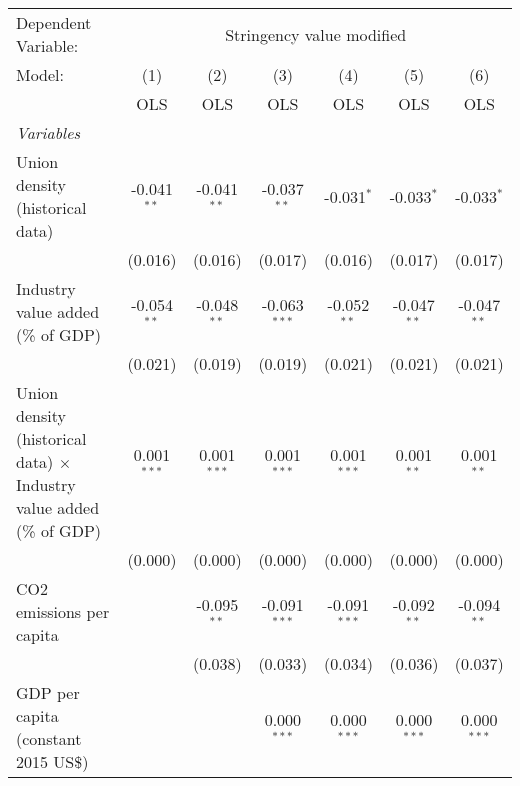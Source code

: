 
\begingroup
\centering
\begin{tabular}{lcccccc}
   \toprule
   Dependent Variable: & \multicolumn{6}{c}{Stringency value modified}\\
   Model:                                                                      & (1)           & (2)           & (3)            & (4)            & (5)           & (6)\\  
                                                                               &  OLS          & OLS           & OLS            & OLS            & OLS           & OLS\\  
   \midrule
   \emph{Variables}\\
   Union density (historical data)                                             & -0.041$^{**}$ & -0.041$^{**}$ & -0.037$^{**}$  & -0.031$^{*}$   & -0.033$^{*}$  & -0.033$^{*}$\\   
                                                                               & (0.016)       & (0.016)       & (0.017)        & (0.016)        & (0.017)       & (0.017)\\   
   Industry value added (\% of GDP)                                            & -0.054$^{**}$ & -0.048$^{**}$ & -0.063$^{***}$ & -0.052$^{**}$  & -0.047$^{**}$ & -0.047$^{**}$\\   
                                                                               & (0.021)       & (0.019)       & (0.019)        & (0.021)        & (0.021)       & (0.021)\\   
   Union density (historical data) $\times$ Industry value added (\% of GDP)   & 0.001$^{***}$ & 0.001$^{***}$ & 0.001$^{***}$  & 0.001$^{***}$  & 0.001$^{**}$  & 0.001$^{**}$\\   
                                                                               & (0.000)       & (0.000)       & (0.000)        & (0.000)        & (0.000)       & (0.000)\\   
   CO2 emissions per capita                                                    &               & -0.095$^{**}$ & -0.091$^{***}$ & -0.091$^{***}$ & -0.092$^{**}$ & -0.094$^{**}$\\   
                                                                               &               & (0.038)       & (0.033)        & (0.034)        & (0.036)       & (0.037)\\   
   GDP per capita (constant 2015 US\$)                                         &               &               & 0.000$^{***}$  & 0.000$^{***}$  & 0.000$^{***}$ & 0.000$^{***}$\\   

\end{tabular}
